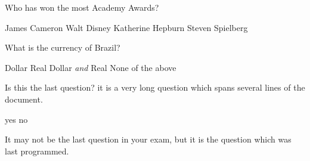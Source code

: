 \documentclass[a4paper]{article}
\begin{document}
\begin{mcquestions}
          \begin{mcanswerslist}[ordinal]
          \end{mcanswerslist}

\question Who has won the most Academy Awards?

          \begin{mcanswerslist}
          \answer James Cameron
          \answer[correct] Walt Disney
          \answer Katherine Hepburn
          \answer Steven Spielberg
          \end{mcanswerslist}

\question What is the currency of Brazil?

          \begin{mcanswerslist}[{1,2,3,4},{2,1,3,4}]
          \answer Dollar
          \answer[correct] Real
          \answer Dollar \emph{and} Real
          \answer None of the above
          \end{mcanswerslist} 
 
 
 
 
 
\question Is this the last question? it is a very long question which spans several lines of the document.

          \begin{mcanswerslist}[permutenone]
          \answer[correct] yes
          \answer no
          \end{mcanswerslist}
          
          \begin{mcexplanation}
          It may not be the last question in your exam, but it is the question which was last programmed.
          \end{mcexplanation} 
 
 
\end{mcquestions}











 
 
 
\end{document}

